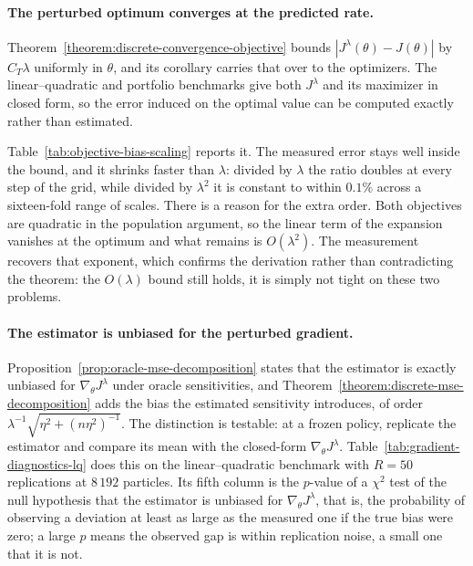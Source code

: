 \paragraph{The perturbed optimum converges at the predicted rate.}
Theorem~\ref{theorem:discrete-convergence-objective} bounds $|J^\lambda(\theta)-J(\theta)|$ by $C_T\lambda$ uniformly in $\theta$, and its corollary carries that over to the optimizers. The linear--quadratic and portfolio benchmarks give both $J^\lambda$ and its maximizer in closed form, so the error induced on the optimal value can be computed exactly rather than estimated.

Table~\ref{tab:objective-bias-scaling} reports it. The measured error stays well inside the bound, and it shrinks faster than $\lambda$: divided by $\lambda$ the ratio doubles at every step of the grid, while divided by $\lambda^2$ it is constant to within $0.1\%$ across a sixteen-fold range of scales. There is a reason for the extra order. Both objectives are quadratic in the population argument, so the linear term of the expansion vanishes at the optimum and what remains is $O(\lambda^2)$. The measurement recovers that exponent, which confirms the derivation rather than contradicting the theorem: the $O(\lambda)$ bound still holds, it is simply not tight on these two problems.




\paragraph{The estimator is unbiased for the perturbed gradient.}
Proposition~\ref{prop:oracle-mse-decomposition} states that the estimator is exactly unbiased for $\nabla_\theta J^\lambda$ under oracle sensitivities, and Theorem~\ref{theorem:discrete-mse-decomposition} adds the bias the estimated sensitivity introduces, of order $\lambda^{-1}\sqrt{\eta^2+(n\eta^2)^{-1}}$. The distinction is testable: at a frozen policy, replicate the estimator and compare its mean with the closed-form $\nabla_\theta J^\lambda$. Table~\ref{tab:gradient-diagnostics-lq} does this on the linear--quadratic benchmark with $R=50$ replications at $8\,192$ particles. Its fifth column is the $p$-value of a $\chi^2$ test of the null hypothesis that the estimator is unbiased for $\nabla_\theta J^\lambda$, that is, the probability of observing a deviation at least as large as the measured one if the true bias were zero; a large $p$ means the observed gap is within replication noise, a small one that it is not.

